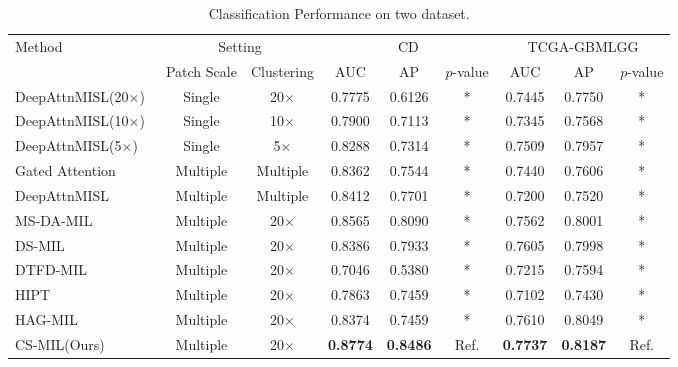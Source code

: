 \documentclass[times,twocolumn,final]{elsarticle}
\begin{document}
\begin{table*}[t]
\caption{Classification Performance on two dataset.}
\begin{center}
\begin{adjustbox}{width=0.95\textwidth}
\begin{tabular}{l|cc|ccc|ccc}
\toprule
\multirow{1}{0.8in}{Method} & \multicolumn{2}{c}{Setting} & \multicolumn{3}{c}{CD} &  \multicolumn{3}{c}{TCGA-GBMLGG} \\
\cmidrule(lr){2-3}
\cmidrule(lr){4-6}
\cmidrule(lr){7-9}
& Patch Scale & Clustering & AUC & AP & $p$-value & AUC & AP & $p$-value\\
\midrule
DeepAttnMISL(20$\times$)~\citep{yao2020whole} & Single & 20$\times$ &  0.7775 & 0.6126 & * & 0.7445 & 0.7750 & *\\
DeepAttnMISL(10$\times$)~\citep{yao2020whole} & Single & 10$\times$ & 0.7900 & 0.7113 & * & 0.7345 &  0.7568 & *\\
DeepAttnMISL(5$\times$)~\citep{yao2020whole} & Single & 5$\times$ & 0.8288 & 0.7314 & * & 0.7509 & 0.7957 & *\\
\midrule
Gated Attention~\citep{ilse2018attention} & Multiple & Multiple & 0.8362 & 0.7544 & * & 0.7440 & 0.7606 & *\\
DeepAttnMISL~\citep{yao2020whole} & Multiple & Multiple & 0.8412 & 0.7701 & * & 0.7200 &  0.7520 & *\\
\midrule
MS-DA-MIL~\citep{Hashimoto_2020_CVPR} & Multiple & 20$\times$ & 0.8565 & 0.8090 & * & 0.7562 & 0.8001 & *\\
DS-MIL~\citep{Li_2021_CVPR} & Multiple & 20$\times$ & 0.8386 & 0.7933 & * & 0.7605 & 0.7998 & *\\
DTFD-MIL~\citep{zhang2022dtfd} & Multiple & 20$\times$ & 0.7046 & 0.5380 & * & 0.7215 & 0.7594 & *\\
HIPT~\citep{chen2022scaling} & Multiple & 20$\times$ & 0.7863 & 0.7459 & * & 0.7102 & 0.7430 & *\\
HAG-MIL~\citep{xiong2023diagnose} & Multiple & 20$\times$ & 0.8374 & 0.7459 & * & 0.7610 & 0.8049 & *\\
CS-MIL(Ours) & Multiple & 20$\times$ & \textbf{0.8774} & \textbf{0.8486} & Ref. &\textbf{0.7737} & \textbf{0.8187} & Ref.\\
\bottomrule
\end{tabular}
\end{adjustbox}
\end{center}
\noindent{} \\
\noindent{}\\
\label{tab:Classification}
\end{table*}
\end{document}
